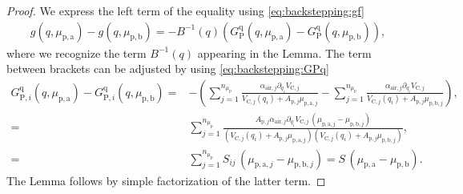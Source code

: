 \begin{proof}
	We express the left term of the equality using \eqref{eq:backstepping:gf}
	\begin{equation*}%
	\begin{split}
	g(q,\mu_{\mathrm{p},\mathrm{a}}) - g(q,\mu_{\mathrm{p},\mathrm{b}}) 
	=-B^{-1}(q) (G_{\mathrm{P}}^{\mathrm{q}}(q,\mu_{\mathrm{p},\mathrm{a}}) - G_{\mathrm{P}}^{\mathrm{q}}(q,\mu_{\mathrm{p},\mathrm{b}})),
	\end{split}
	\end{equation*}
	where we recognize the term $B^{-1}(q)$ appearing in the Lemma. The term between brackets can be adjusted by using \eqref{eq:backstepping:GPq}
	\begin{equation}
	\begin{split}
		G_{\mathrm{P},i}^{\mathrm{q}}(q,\mu_{\mathrm{p},\mathrm{a}}) - G_{\mathrm{P},i}^{\mathrm{q}}(q,\mu_{\mathrm{p},\mathrm{b}}) = &-\left(\sum_{j = 1}^{n_{\mu_\mathrm{p}}}  \frac{\alpha_{\mathrm{air},j} \partial_{q_i}V_{\mathrm{C},j}}{V_{\mathrm{C},j}(q_i) + A_{\mathrm{p},j} \mu_{\mathrm{p},\mathrm{a},j}} \!-\! \sum_{j = 1}^{n_{\mu_\mathrm{p}}}  \frac{\alpha_{\mathrm{air},j} \partial_{q_i}V_{\mathrm{C},j}}{V_{\mathrm{C},j}(q_i) + A_{\mathrm{p},j} \mu_{\mathrm{p},\mathrm{b},j}}\right),  \\
	= &\sum_{j = 1}^{n_{\mu_\mathrm{p}}} \frac{A_{\mathrm{p},j} \alpha_{\mathrm{air},j} \partial_{q_i}V_{\mathrm{C},j} \, (\mu_{\mathrm{p},\mathrm{a},j} - \mu_{\mathrm{p},\mathrm{b},j})}{(V_{\mathrm{C},j}(q_i) + A_{\mathrm{p},j} \mu_{\mathrm{p},\mathrm{a},j})(V_{\mathrm{C},j}(q_i) + A_{\mathrm{p},j} \mu_{\mathrm{p},\mathrm{b},j})},\\
        = &\sum_{j = 1}^{n_{\mu_\mathrm{p}}} S_{ij} \, (\mu_{\mathrm{p},\mathrm{a},j} - \mu_{\mathrm{p},\mathrm{b},j}) = S \, (\mu_{\mathrm{p},\mathrm{a}} - \mu_{\mathrm{p},\mathrm{b}}).
	\end{split}
	\end{equation}
	The Lemma follows by simple factorization of the latter term.
\end{proof}

